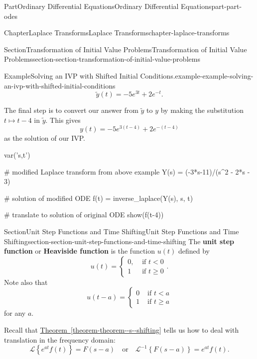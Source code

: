 \documentclass[twoside,10pt,]{book}
\newcommand{\xreffont}{\relax}
\newcommand{\terminology}[1]{\textbf{#1}}
\numberwithin{equation}{part}
\newcommand{\Laplace}[1]{\mathcal{L}\set{#1}}
\newcommand{\iLaplace}[1]{\mathcal{L}^{-1}\set{#1}}
\newcommand{\set}[1]{\left\{ #1 \right\}}
\newcommand{\lt}{<}
\newcommand{\amp}{&}
\begin{document}
\begin{partptx}{Part}{Ordinary Differential Equations}{}{Ordinary Differential Equations}{}{}{part-part-odes}
\begin{chapterptx}{Chapter}{Laplace Transforms}{}{Laplace Transforms}{}{}{chapter-laplace-transforms}
\begin{sectionptx}{Section}{Transformation of Initial Value Problems}{}{Transformation of Initial Value Problems}{}{}{section-section-transformation-of-initial-value-problems}
\begin{example}{Example}{Solving an IVP with Shifted Initial Conditions.}{example-example-solving-an-ivp-with-shifted-initial-conditions}
\begin{equation*}
\widetilde{y}(t) = -5e^{3t} + 2e^{-t}.
\end{equation*}
%
\par
The final step is to convert our answer from \(\widetilde{y}\) to \(y\) by making the substitution \(t\mapsto t-4\) in \(\widetilde{y}\). This gives%
\begin{equation*}
y(t) = -5e^{3(t-4)} + 2e^{-(t-4)}
\end{equation*}
as the solution of our IVP.%
\end{example}
\begin{sageinput}
var('s,t')

# modified Laplace transform from above example
Y(s) = (-3*s-11)/(s^2 - 2*s - 3)

# solution of modified ODE
f(t) = inverse_laplace(Y(s), s, t)

# translate to solution of original ODE
show(f(t-4))
\end{sageinput}
\end{sectionptx}
%
%
\typeout{************************************************}
\typeout{************************************************}
%
\begin{sectionptx}{Section}{Unit Step Functions and Time Shifting}{}{Unit Step Functions and Time Shifting}{}{}{section-section-unit-step-functions-and-time-shifting}
The \terminology{unit step function} or \terminology{Heaviside function} is the function \(u(t)\) defined by%
\begin{equation*}
u(t) = \begin{cases}
0, \amp\text{ if }t\lt 0\\
1 \amp\text{ if } t\geq0
\end{cases}.
\end{equation*}
Note also that%
\begin{equation*}
u(t-a) = \begin{cases}
0 \amp\text{ if }t\lt a\\
1 \amp\text{ if } t\geq a
\end{cases}
\end{equation*}
for any \(a\).%
\par
Recall that \hyperref[theorem-theorem--s--shifting]{Theorem~{\xreffont\ref{theorem-theorem--s--shifting}}} tells us how to deal with translation in the frequency domain:%
\begin{equation*}
\Laplace{e^{at}f(t)} = F(s-a) \quad\text{or}\quad\iLaplace{F(s-a)} = e^{at}f(t).
\end{equation*}

\end{sectionptx}
\end{chapterptx}
\end{partptx}
\end{document}
